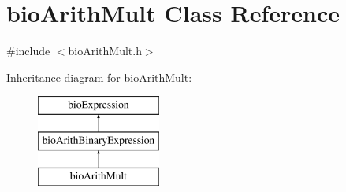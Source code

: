 \hypertarget{classbio_arith_mult}{}\section{bio\+Arith\+Mult Class Reference}
\label{classbio_arith_mult}


{\ttfamily \#include $<$bio\+Arith\+Mult.\+h$>$}

Inheritance diagram for bio\+Arith\+Mult\+:\begin{figure}[H]
\begin{center}
\leavevmode
\includegraphics[height=3.000000cm]{classbio_arith_mult}
\end{center}
\end{figure}
